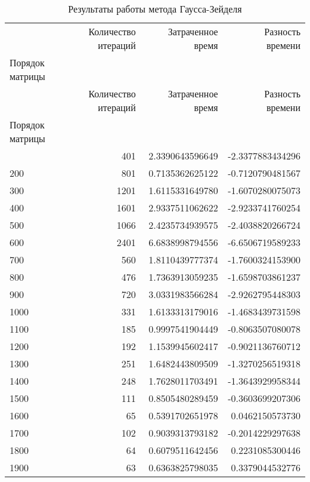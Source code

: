 \begin{longtable}{lrrr}
\label{gsSympos}\\
\caption{Результаты  работы метода Гаусса-Зейделя}\\
\toprule
 & Количество итераций & Затраченное время & Разность времени \\
Порядок матрицы &  &  &  \\
\midrule
\endfirsthead
\toprule
 & Количество итераций & Затраченное время & Разность времени \\
Порядок матрицы &  &  &  \\
\midrule
\endhead
\midrule
\midrule
\endfoot
\bottomrule
\endlastfoot
100 & 401 & 2.3390643596649 & -2.3377883434296 \\
200 & 801 & 0.7135362625122 & -0.7120790481567 \\
300 & 1201 & 1.6115331649780 & -1.6070280075073 \\
400 & 1601 & 2.9337511062622 & -2.9233741760254 \\
500 & 1066 & 2.4235734939575 & -2.4038820266724 \\
600 & 2401 & 6.6838998794556 & -6.6506719589233 \\
700 & 560 & 1.8110439777374 & -1.7600324153900 \\
800 & 476 & 1.7363913059235 & -1.6598703861237 \\
900 & 720 & 3.0331983566284 & -2.9262795448303 \\
1000 & 331 & 1.6133313179016 & -1.4683439731598 \\
1100 & 185 & 0.9997541904449 & -0.8063507080078 \\
1200 & 192 & 1.1539945602417 & -0.9021136760712 \\
1300 & 251 & 1.6482443809509 & -1.3270256519318 \\
1400 & 248 & 1.7628011703491 & -1.3643929958344 \\
1500 & 111 & 0.8505480289459 & -0.3603699207306 \\
1600 & 65 & 0.5391702651978 & 0.0462150573730 \\
1700 & 102 & 0.9039313793182 & -0.2014229297638 \\
1800 & 64 & 0.6079511642456 & 0.2231085300446 \\
1900 & 63 & 0.6363825798035 & 0.3379044532776 \\
\end{longtable}

